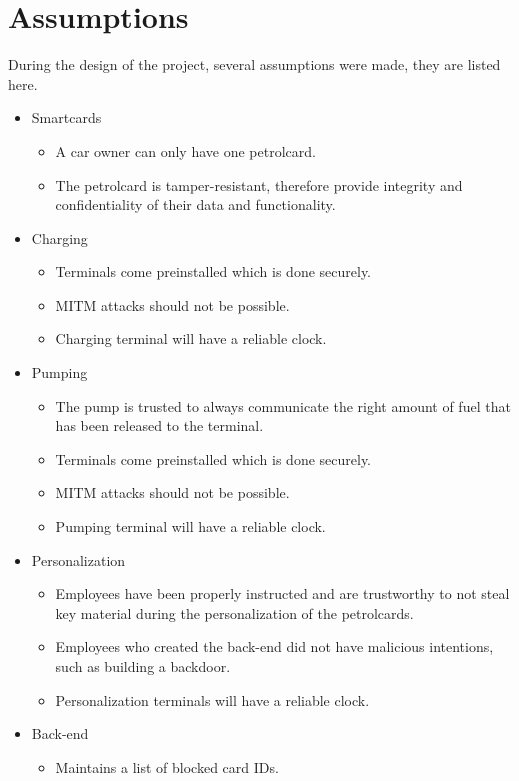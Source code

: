 \section{Assumptions}
During the design of the project, several assumptions were made, they are listed here.
\begin{itemize}
\item Smartcards
\begin{itemize}
	\item A car owner can only have one petrolcard.
	\item The petrolcard is tamper-resistant, therefore provide integrity and confidentiality of their data and functionality.
\end{itemize}

\item Charging
\begin{itemize}
\item Terminals come preinstalled which is done securely.
\item MITM attacks should not be possible.
\item Charging terminal will have a reliable clock.
\end{itemize}


\item Pumping
\begin{itemize}
\item The pump is trusted to always communicate the right amount of fuel that has been released to the terminal.
\item Terminals come preinstalled which is done securely.
\item MITM attacks should not be possible.
\item Pumping terminal will have a reliable clock.
\end{itemize}

 
\item Personalization
\begin{itemize}
\item Employees have been properly instructed and are trustworthy to not steal key material during the personalization of the petrolcards.
\item Employees who created the back-end did not have malicious intentions, such as building a backdoor.
\item Personalization terminals will have a reliable clock.
\end{itemize}

\item Back-end
\begin{itemize}
\item Maintains a list of blocked card IDs.
\end{itemize}
\end{itemize}

 